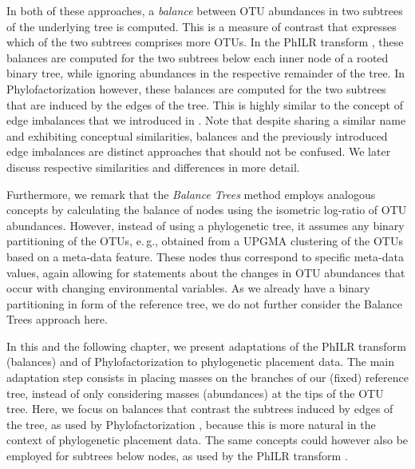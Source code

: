 In both of these approaches, a \emph{balance} between OTU abundances in two subtrees of the underlying tree is computed.
This is a measure of contrast that expresses which of the two subtrees comprises more OTUs.
In the PhILR transform  \cite{Silverman2017}, these balances are computed
for the two subtrees below each inner node of a rooted binary tree,
while ignoring abundances in the respective remainder of the tree.
In Phylofactorization however, these balances are computed for the two subtrees that are induced by the edges of the tree.
This is highly similar to the concept of edge imbalances 
that we introduced in .
Note that despite sharing a similar name and exhibiting conceptual similarities,
balances and the previously introduced edge imbalances are distinct approaches that should not be confused.
We later discuss respective similarities and differences in more detail.

Furthermore, we remark that the \emph{Balance Trees} method \cite{Morton2017} employs analogous concepts
by calculating the balance of nodes using the isometric log-ratio of OTU abundances.
However, instead of using a phylogenetic tree, it assumes any binary partitioning of the OTUs,
e.\,g., obtained from a UPGMA clustering of the OTUs based on a meta-data feature.
These nodes thus correspond to specific meta-data values,
again allowing for statements about the changes in OTU abundances that occur with changing environmental variables.
As we already have a binary partitioning in form of the reference tree,
we do not further consider the Balance Trees approach here.

In this and the following chapter, we present adaptations of the PhILR transform (balances)
and of Phylofactorization to phylogenetic placement data.
The main adaptation step consists in placing masses on the branches of our (fixed) reference tree,
instead of only considering masses (abundances) at the tips of the OTU tree.
Here, we focus on balances that contrast the subtrees induced by edges of the tree,
as used by Phylofactorization \cite{Washburne2017a},
because this is more natural in the context of phylogenetic placement data.
The same concepts could however also be employed for subtrees below nodes,
as used by the PhILR transform \cite{Silverman2017}.

